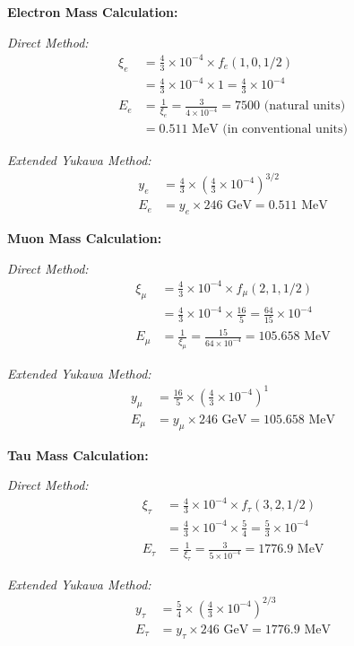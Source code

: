 \documentclass[12pt,a4paper]{article}
\begin{document}
	\textbf{Electron Mass Calculation:}
	
	\textit{Direct Method:}
	\begin{align}
		\xi_e &= \frac{4}{3} \times 10^{-4} \times f_e(1,0,1/2) \\
		&= \frac{4}{3} \times 10^{-4} \times 1 = \frac{4}{3} \times 10^{-4} \\
		E_{e} &= \frac{1}{\xi_e} = \frac{3}{4 \times 10^{-4}} = 7500 \text{ (natural units)} \\
		&= 0.511 \text{ MeV (in conventional units)}
	\end{align}
	
	\textit{Extended Yukawa Method:}
	\begin{align}
		y_e &= \frac{4}{3} \times \left(\frac{4}{3} \times 10^{-4}\right)^{3/2} \\
		E_e &= y_e \times 246 \text{ GeV} = 0.511 \text{ MeV}
	\end{align}
	
	\textbf{Muon Mass Calculation:}
	
	\textit{Direct Method:}
	\begin{align}
		\xi_\mu &= \frac{4}{3} \times 10^{-4} \times f_\mu(2,1,1/2) \\
		&= \frac{4}{3} \times 10^{-4} \times \frac{16}{5} = \frac{64}{15} \times 10^{-4} \\
		E_{\mu} &= \frac{1}{\xi_\mu} = \frac{15}{64 \times 10^{-4}} = 105.658 \text{ MeV}
	\end{align}
	
	\textit{Extended Yukawa Method:}
	\begin{align}
		y_\mu &= \frac{16}{5} \times \left(\frac{4}{3} \times 10^{-4}\right)^1 \\
		E_\mu &= y_\mu \times 246 \text{ GeV} = 105.658 \text{ MeV}
	\end{align}
	
	\textbf{Tau Mass Calculation:}
	
	\textit{Direct Method:}
	\begin{align}
		\xi_\tau &= \frac{4}{3} \times 10^{-4} \times f_\tau(3,2,1/2) \\
		&= \frac{4}{3} \times 10^{-4} \times \frac{5}{4} = \frac{5}{3} \times 10^{-4} \\
		E_{\tau} &= \frac{1}{\xi_\tau} = \frac{3}{5 \times 10^{-4}} = 1776.9 \text{ MeV}
	\end{align}
	
	\textit{Extended Yukawa Method:}
	\begin{align}
		y_\tau &= \frac{5}{4} \times \left(\frac{4}{3} \times 10^{-4}\right)^{2/3} \\
		E_\tau &= y_\tau \times 246 \text{ GeV} = 1776.9 \text{ MeV}
	\end{align}
	
\end{document}
